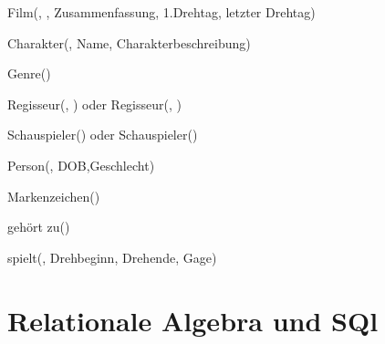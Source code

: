 \documentclass[a4paper, 12pt]{document}
\begin{document}
\begin{RMSchma}
Film(, , Zusammenfassung, 1.Drehtag, letzter Drehtag)

Charakter(, Name, Charakterbeschreibung)

Genre()

Regisseur(, ) oder Regisseur(, )

Schauspieler() oder Schauspieler()

Person(, DOB,Geschlecht)

Markenzeichen()

geh\"ort zu()

spielt(, Drehbeginn, Drehende, Gage)

\end{RMSchma}






\section{Relationale Algebra und SQl}
\end{document}
